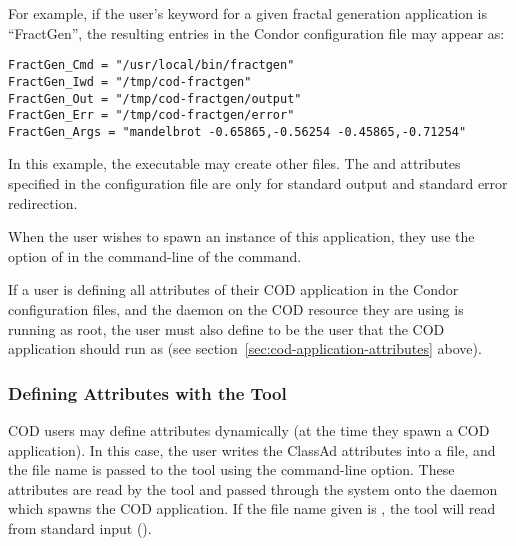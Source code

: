 For example, if the user's keyword for a given fractal generation
application is ``FractGen'', the resulting entries in the Condor
configuration file may appear as:

\begin{verbatim}
FractGen_Cmd = "/usr/local/bin/fractgen"
FractGen_Iwd = "/tmp/cod-fractgen"
FractGen_Out = "/tmp/cod-fractgen/output"
FractGen_Err = "/tmp/cod-fractgen/error"
FractGen_Args = "mandelbrot -0.65865,-0.56254 -0.45865,-0.71254"
\end{verbatim}

In this example, the executable may create other files.
The  and  attributes specified in the
configuration file are only for standard output and standard error
redirection.

When the user wishes to spawn an instance of this application,
they use the  option of  
in the command-line of the  command.

\Note If a user is defining all attributes of their COD application in
the Condor configuration files, and the  daemon on the COD
resource they are using is running as root, the user must also define
 to be the user that the COD application should run as
(see section~\ref{sec:cod-application-attributes} above). 


\subsubsection{\label{sec:cod-command-line-attrs}
Defining Attributes with the  Tool} 

COD users may define attributes dynamically (at the time they spawn a
COD application).
In this case, the user writes the ClassAd attributes into a file, and the
file name is passed to the  tool using the
 command-line option.
These attributes are read by the  tool and passed through
the system onto the  daemon which spawns the COD application. 
If the file name given is \File{-}, the  tool will read
from standard input ().



